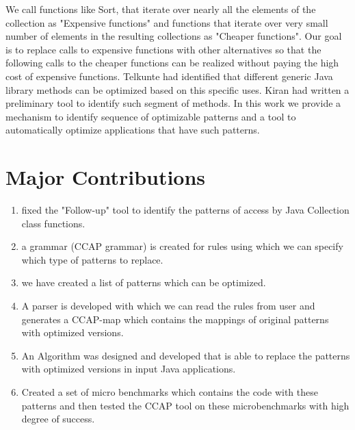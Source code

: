 We call functions like Sort, that iterate over nearly all the elements of the collection as "Expensive functions" and functions that iterate over very small number of elements in the resulting collections as "Cheaper functions". Our goal is to replace calls to expensive functions with other alternatives so that the following calls to the cheaper functions can be realized without paying the high cost of expensive functions.
Telkunte \cite{MTP_2017} had identified that different generic Java library methods can be optimized based on this specific uses. Kiran \cite{Vishnu_Kiran} had written a preliminary tool to identify such segment of methods. In this work we provide a mechanism to identify sequence of optimizable patterns and a tool to automatically optimize applications that have such patterns.

\section{Major Contributions}
\begin{enumerate} [blt]
    \item fixed the "Follow-up" \cite{Vishnu_Kiran} tool to identify the patterns of access by Java Collection class functions. 
    \item a grammar (CCAP grammar) is created for rules using which we can specify which type of patterns to replace.
    \item we have created a list of patterns which can be optimized.
    \item A parser is developed with which we can read the rules from user and generates a CCAP-map which contains the mappings of original patterns with optimized versions.
    \item An Algorithm was designed and developed that is able to replace the patterns with optimized versions in input Java applications.
    \item Created a set of micro benchmarks which contains the code with these patterns and then tested the CCAP tool on these microbenchmarks with high degree of success. 
\end{enumerate}
